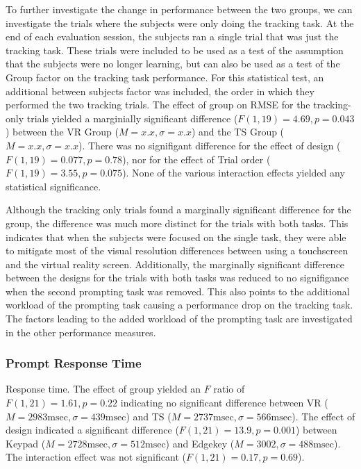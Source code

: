To further investigate the change in performance between the two groups, we can investigate the trials where the subjects were only doing the tracking task.
At the end of each evaluation session, the subjects ran a single trial that was just the tracking task.
These trials were included to be used as a test of the assumption that the subjects were no longer learning, but can also be used as a test of the Group factor on the tracking task performance.
For this statistical test, an additional between subjects factor was included, the order in which they performed the two tracking trials.
The effect of group on RMSE for the tracking-only trials yielded a marginially significant difference ($F(1, 19) = 4.69, p = 0.043$) between the VR Group ($M=x.x, \sigma=x.x$) and the TS Group ($M=x.x, \sigma=x.x$).
There was no signifigant difference for the effect of design ($F(1,19) = 0.077, p=0.78$), nor for the effect of Trial order ($F(1, 19) = 3.55, p = 0.075$).
None of the various interaction effects yielded any statistical significance.

Although the tracking only trials found a marginally significant difference for the group, the difference was much more distinct for the trials with both tasks.
This indicates that when the subjects were focused on the single task, they were able to mitigate most of the visual resolution differences between using a touchscreen and the virtual reality screen.
Additionally, the marginally significant difference between the designs for the trials with both tasks was reduced to no signifigance when the second prompting task was removed.
This also points to the additional workload of the prompting task causing a performance drop on the tracking task.
The factors leading to the added workload of the prompting task are investigated in the other performance measures.

\subsubsection{Prompt Response Time}

Response time.
The effect of group yielded an $F$ ratio of $F(1, 21) = 1.61, p = 0.22$ indicating no significant difference between VR ($M = 2983\mathrm{msec}, \sigma = 439\mathrm{msec}$) and TS ($M = 2737\mathrm{msec}, \sigma = 566\mathrm{msec}$).
The effect of design indicated a significant difference ($F(1, 21) = 13.9, p = 0.001$) between Keypad ($M=2728\mathrm{msec}, \sigma=512\mathrm{msec}$) and Edgekey ($M=3002, \sigma=488\mathrm{msec}$).
The interaction effect was not significant ($F(1, 21) = 0.17, p = 0.69$).

